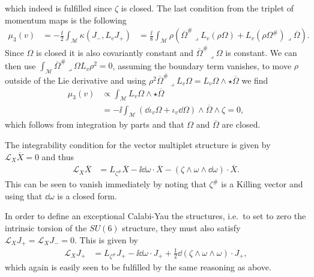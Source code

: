 which indeed is fulfilled since $\zeta$ is closed. The last condition from the triplet of momentum maps is the following 
\begin{equation}
    \begin{aligned}
    \mu_3(v) &= -\frac{\ii}{2}\int_\mathcal{M}\kappa(J_-,L_vJ_+)
             &= \frac{\ii}{8}\int_\mathcal{M}\rho \left(\overbar{\Omega}^{\#}\lrcorner L_v(\rho \Omega)+L_v(\rho\Omega^{\#})\lrcorner \overbar{\Omega}\right).
    \end{aligned}
\end{equation}
Since $\Omega$ is closed it is also covariantly constant and $\overbar{\Omega}^{\#}\lrcorner \Omega$ is constant. We can then use $\int_\mathcal{M}\overbar{\Omega}^{\#}\lrcorner \Omega L_v\rho^2=0$, assuming the boundary term vanishes, to move $\rho$ outside of the Lie derivative and using $\rho^2\overbar{\Omega}^{\#}\lrcorner L_v \Omega=L_v \Omega\wedge \star\overbar{\Omega}$ we find
\begin{equation}
    \begin{aligned}
    \mu_3(v) &\propto \int_\mathcal{M}L_v\Omega\wedge\star\overbar{\Omega}\\
             &=-\ii\int_\mathcal{M}(\dd\iota_v\Omega+\iota_v\dd\Omega)\wedge\overbar{\Omega}\wedge\zeta=0,
    \end{aligned}
\end{equation}
which follows from integration by parts and that $\Omega$ and $\overbar{\Omega}$ are closed. 
 
The integrability condition for the vector multiplet structure is given by $\mathscr{L}_X\overbar{X}=0$ and thus
\begin{equation}
    \begin{aligned}
    \mathscr{L}_X\overbar{X} &= L_{\zeta^{\#}}\overbar{X}-\ii\dd\omega\cdot \overbar{X}-(\zeta\wedge\omega\wedge\dd\omega)\cdot \overbar{X}.
    \end{aligned}
\end{equation}
This can be seen to vanish immediately by noting that $\zeta^{\#}$ is a Killing vector and using that $\dd\omega$ is a closed form. 

In order to define an exceptional Calabi-Yau the structures, i.e.\ to set to zero the intrinsic torsion of the $SU(6)$ structure, they must also satisfy $\mathscr{L}_XJ_+=\mathscr{L}_XJ_-=0$. This is given by 
\begin{equation}
    \begin{aligned}
    \mathscr{L}_X J_+ &= L_{\zeta^{\#}}J_+-\ii\dd\omega\cdot J_++\frac{1}{2}\dd(\zeta\wedge\omega\wedge\omega)\cdot J_+,
    \end{aligned}
\end{equation}
which again is easily seen to be fulfilled by the same reasoning as above. 

